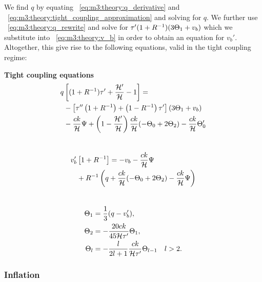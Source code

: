     We find $q$ by equating ~\cref{eq:m3:theory:q_derivative} and ~\cref{eq:m3:theory:tight_coupling_approximation} and solving for $q$. We further use ~\cref{eq:m3:theory:q_rewrite} and solve for $\tau'(1+R^{-1})(3\Theta_1+v_b)$ which we substitute into ~\cref{eq:m3:theory:v_b} in order to obtain an equation for $v_b'$. Altogether, this give rise to the following equations, valid in the tight coupling regime:
    \begin{tcolorbox}[
        width=1.025\linewidth,
        colback=blue!5!white,
        colframe=white
    ]
    \textbf{Tight coupling equations}
    \begin{equation}\label{eq:m3:theory:tight_coupling_q}
        \begin{split}
            q&\left[(1+R^{-1})\tau'+\frac{\mathcal{H}'}{\mathcal{H}}-1\right] = \\
            &- \left[\tau''\left(1+R^{-1}\right)+\left(1-R^{-1}\right)\tau'\right](3\Theta_1+v_b) \\
            &- \frac{ck}{\mathcal{H}}\Psi+\left(1-\frac{\mathcal{H}'}{\mathcal{H}}\right)\frac{ck}{\mathcal{H}}(-\Theta_0+2\Theta_2)-\frac{ck}{\mathcal{H}}\Theta_0'
        \end{split}
    \end{equation}
    \\
    \begin{equation}\label{eq:m3:theory:tight_coupling_v_b}
        \begin{split}
            v_b'&\left[1+R^{-1}\right] = -v_b-\frac{ck}{\mathcal{H}}\Psi\\
            &+R^{-1}\left(q+\frac{ck}{\mathcal{H}}(-\Theta_0+2\Theta_2)-\frac{ck}{\mathcal{H}}\Psi\right)
        \end{split}
    \end{equation}
    \\
    \begin{subequations}\label{eq:m3:theory:tight_coupling_all_poles}
        \begin{align}
            \Theta_1 &= \frac{1}{3}(q-v_b'), \label{eq:m3:theory:tight_coupling_monopole}\\
            \Theta_2 &= -\frac{20ck}{45\mathcal{H}\tau'}\Theta_1, \label{eq:m3:theory:tight_coupling_dipole}\\
            \Theta_l &= -\frac{l}{2l+1}\frac{ck}{\mathcal{H}\tau'}\Theta_{l-1} \quad l>2. \label{eq:m3:theory:tight_coupling_multipole}
        \end{align}
    \end{subequations}
    \end{tcolorbox}

\subsubsection{Inflation}
